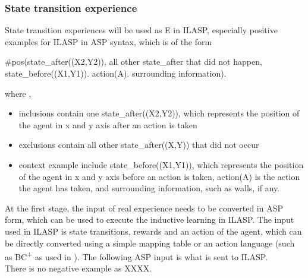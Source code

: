 \subsubsection{State transition experience}
State transition experiences will be used as E in ILASP, especially positive examples for ILASP in ASP syntax, which is of the form

\#pos({state\_after((X2,Y2))}, {all other state\_after that did not happen}, {state\_before((X1,Y1)). action(A). surrounding information}).

where ,  
\begin{itemize}
    \item inclusions contain one state\_after((X2,Y2)), which represents the position of the agent in x and y axis after an action is taken 
    \item exclusions contain all other state\_after((X,Y)) that did not occur
    \item context example include state\_before((X1,Y1)), which represents the position of the agent in x and y axis before an action is taken,
    action(A) is the action the agent has taken, and surrounding information, such as walls, if any. 
\end{itemize}


At the first stage, the input of real experience needs to be converted in ASP form, which can be used to execute the inductive learning in ILASP. The input used in ILASP is state transitions, 
rewards and an action of the agent, which can be directly converted using a simple mapping table or an action language (such as BC\textsuperscript{+} as used in \cite{Ferreira2017}). 
The following ASP input is what is sent to ILASP. \\

There is no negative example as XXXX. 

